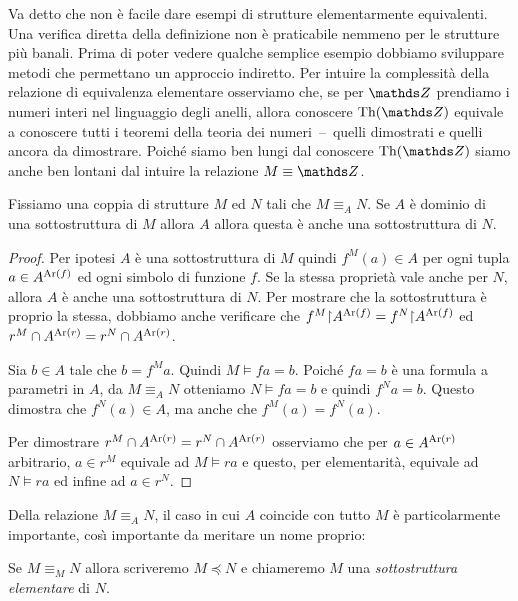 Va detto che non \`e facile dare esempi di strutture elementarmente equivalenti. Una verifica diretta della definizione non \`e praticabile nemmeno per le strutture pi\`u banali. Prima di poter vedere qualche semplice esempio dobbiamo sviluppare metodi che permettano un approccio indiretto. Per intuire la complessit\`a della relazione di equivalenza elementare osserviamo che, se per $\ZZ$ prendiamo i numeri interi nel linguaggio degli anelli, allora conoscere $\Th(\ZZ)$ equivale a conoscere tutti i teoremi della teoria dei numeri~--~quelli dimostrati e quelli ancora da dimostrare. Poich\'e siamo ben lungi dal conoscere $\Th(\ZZ)$ siamo anche ben lontani dal intuire la relazione $M\equiv \ZZ$. 

\begin{lemma}\label{eqelsottostruttura}
Fissiamo una coppia di strutture $M$ ed $N$ tali che $M\equiv_AN$. Se $A$ \`e dominio di una sottostruttura di $M$ allora $A$ allora questa  \`e anche una sottostruttura di $N$.
\end{lemma}
\begin{proof}
Per ipotesi $A$ \`e una sottostruttura di $M$ quindi $f^M(a)\in A$ per ogni tupla $a\in A^{{\rm Ar}( f)}$ ed ogni simbolo di funzione $f$. Se la stessa propriet\`a vale anche per $N$, allora $A$ \`e anche una sottostruttura di $N$. Per mostrare che la sottostruttura \`e proprio la stessa, dobbiamo anche verificare che $f^M\mathord\restriction A^{{\rm Ar} (f)}=f^N\mathord\restriction A^{{\rm Ar}(f)}$ ed $r^M\cap A^{{\rm Ar}(r)}=r^N\cap A^{{\rm Ar}(r)}$. 

Sia $b\in A$ tale che $b=f^Ma$. Quindi $M\models fa=b$. Poich\'e  $fa=b$ \`e una formula a parametri in $A$, da $M\equiv_AN$ otteniamo $N\models fa=b$ e quindi $f^Na=b$. Questo dimostra che $f^N(a)\in A$, ma anche che $f^M(a)=f^N(a)$.

Per dimostrare $r^M\cap A^{{\rm Ar}(r)}= r^N\cap A^{{\rm Ar}(r)}$ osserviamo che per $a\in A^{{\rm Ar}(r)}$ arbitrario, $a\in r^M$ equivale ad $M\models ra$ e questo, per elementarit\`a, equivale ad $N\models ra$ ed infine ad $a\in r^N$. 
\end{proof}


Della relazione $M\equiv_A N$, il caso in cui $A$ coincide con tutto $M$ \`e particolarmente importante, cos\`{\i} importante da meritare un nome proprio:

\begin{definition}
Se $M\equiv_M N$ allora scriveremo \emph{$M\preceq N$\/} e chiameremo $M$ una \emph{sottostruttura elementare\/} di $N$.\QED
\end{definition}

